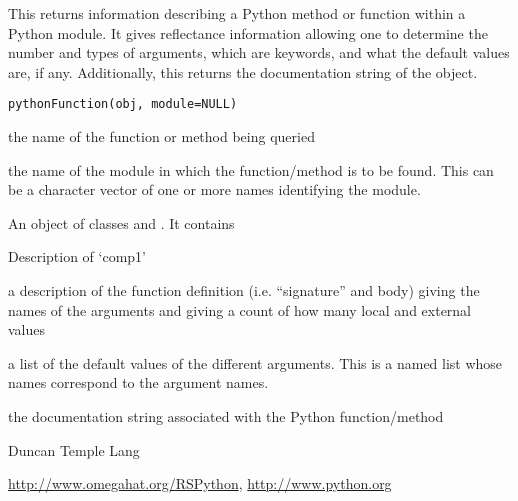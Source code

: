 \begin{Description}\relax
This returns information describing a Python
method or function within a Python module.
It gives reflectance information allowing one to determine
the number and types of arguments, which are keywords, 
and what the default values are, if any.
Additionally, this returns the documentation string of the object.\end{Description}
\begin{Usage}
\begin{verbatim}
pythonFunction(obj, module=NULL)
\end{verbatim}
\end{Usage}
\begin{Arguments}
\begin{ldescription}
\item[\code{obj}] the name of the function or method being queried
\item[\code{module}] the name of the module in which the function/method is to be found. This can be
a character vector of one or more names identifying the module.
\end{ldescription}
\end{Arguments}
\begin{Details}\relax
\end{Details}
\begin{Value}
An object of classes
 and  .
It contains
\begin{ldescription}
\item[\code{name}] Description of `comp1'
\item[\code{code}] a description of the function definition (i.e. ``signature'' and body)
giving the names of the arguments and giving a count of how many local and external
values 

\item[\code{defaults}] a list of the default values of the different arguments. This is a named list
whose names correspond to the argument names.
\item[\code{doc}] the documentation string associated with the Python function/method
\end{ldescription}
\end{Value}
\begin{Author}\relax
Duncan Temple Lang\end{Author}
\begin{References}\relax
\url{http://www.omegahat.org/RSPython},
\url{http://www.python.org}\end{References}
